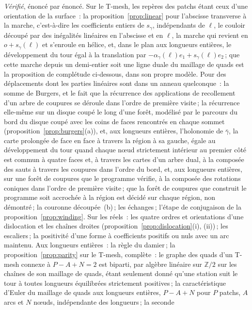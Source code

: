 \documentclass[11pt,a4paper]{article}
\newcommand{\Z}{\mathbb{Z}}
\newcommand{\shift}{s}
\begin{document}
\ifdefined\plain
\emph{Vérifié}, énoncé par énoncé. Sur le T-mesh, les repères des patchs
étant ceux d'une orientation de la surface~: la
proposition~\ref{prop:linear} pour l'abscisse transverse à la marche,
c'est-à-dire les coefficients entiers de $\shift_\gamma$, indépendants de
$\ell$, le couloir découpé par des inégalités linéaires en l'abscisse et en
$\ell$, la marche qui revient en $o + \shift_\gamma(\ell)$ et s'enroule en
hélice, et, dans le plan aux longueurs entières, le développement du tour
égal à la translation par $-\alpha_\gamma(\ell) e_1 + \shift_\gamma(\ell)
e_2$\,; que cette marche depuis un demi-entier soit une ligne duale du
maillage de quads est la proposition de complétude ci-dessous, dans son propre
modèle. Pour des déplacements dont les parties
linéaires sont dans un anneau quelconque~: la somme de Burgers, et le fait que
la récurrence des applications de recollement d'un arbre de coupures se
déroule dans l'ordre de première visite\,; la récurrence elle-même sur un
disque coupé le long d'une forêt, modélisé par le parcours du bord du disque
coupé avec les coins de faces rencontrés en chaque sommet
(proposition~\ref{prop:burgers}(a)), et, aux longueurs entières, l'holonomie
de $\bar\gamma$, la carte prolongée de face en face à travers la région à sa
gauche, égale au développement du tour quand chaque nœud strictement
intérieur au premier côté est commun à quatre faces et, à travers les cartes
d'un arbre dual, à la composée des sauts à travers les coupures dans l'ordre
du bord, et, aux longueurs entières, sur une forêt de coupures que le
programme vérifie, à la composée des rotations coniques dans l'ordre de
première visite\,; que la forêt de coupures que construit le programme soit
accrochée à la région est décidé sur chaque région, non démontré\,; la couronne découpée~(b)\,; les
échanges\,; l'étape de conjugaison de la proposition~\ref{prop:winding}. Sur
les réels~: les quatre ordres et orientations d'une dislocation et les
chaînes droites (proposition~\ref{prop:dislocation}(i), (ii))\,; les
escaliers\,; la positivité d'une forme à coefficients positifs ou nuls avec un
arc maintenu. Aux longueurs entières~: la règle du damier\,; la
proposition~\ref{prop:parity} sur le T-mesh, complète~: le graphe des quads
d'un T-mesh connexe à $P - A + N = 2$ est biparti, par algèbre linéaire sur
$\Z/2$ sur les chaînes de son maillage de quads, étant seulement donné qu'une
station suit le tour à toutes longueurs équilibrées strictement positives\,;
la caractéristique d'Euler du maillage de quads aux longueurs entières, $P -
A + N$ pour $P$ patchs, $A$ arcs et $N$ nœuds, indépendante des longueurs\,; la seconde
\end{document}
